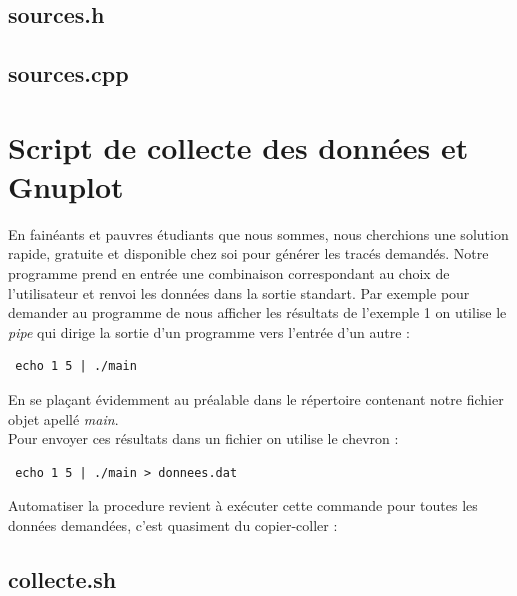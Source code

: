 \documentclass[a4paper,11pt]{article}
\begin{document}
   \subsection{sources.h}
    
    \newpage
   \subsection{sources.cpp}
    
    \newpage




  \section{Script de collecte des données et Gnuplot}
    En fainéants et pauvres étudiants que nous sommes, nous cherchions une solution rapide, gratuite et disponible chez soi pour générer les tracés 
demandés. Notre programme prend en entrée une combinaison correspondant au choix de l'utilisateur et renvoi les données dans la sortie standart.
Par exemple pour demander au programme de nous afficher les résultats de l'exemple 1 on utilise le \textit{pipe} qui dirige la sortie d'un programme 
vers l'entrée d'un autre :

\begin{lstlisting}
 echo 1 5 | ./main
\end{lstlisting}

En se plaçant évidemment au préalable dans le répertoire contenant notre fichier objet apellé \textit{main}.\\
Pour envoyer ces résultats dans un fichier on utilise le chevron :

\begin{lstlisting}
 echo 1 5 | ./main > donnees.dat
\end{lstlisting}

Automatiser la procedure revient à exécuter cette commande pour toutes les données demandées, c'est quasiment du copier-coller :

  \subsection{collecte.sh}
    
\end{document}
